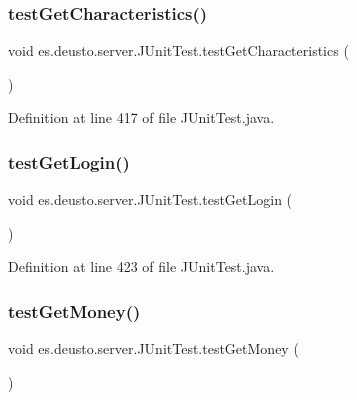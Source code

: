 \subsubsection{\texorpdfstring{test\+Get\+Characteristics()}{testGetCharacteristics()}}
{\footnotesize\ttfamily void es.\+deusto.\+server.\+J\+Unit\+Test.\+test\+Get\+Characteristics (\begin{DoxyParamCaption}{ }\end{DoxyParamCaption})}



Definition at line 417 of file J\+Unit\+Test.\+java.

\mbox{\label{classes_1_1deusto_1_1server_1_1_j_unit_test_a6c7354d3207f6f6e8778d1b85fd31746}} 
\subsubsection{\texorpdfstring{test\+Get\+Login()}{testGetLogin()}}
{\footnotesize\ttfamily void es.\+deusto.\+server.\+J\+Unit\+Test.\+test\+Get\+Login (\begin{DoxyParamCaption}{ }\end{DoxyParamCaption})}



Definition at line 423 of file J\+Unit\+Test.\+java.

\mbox{\label{classes_1_1deusto_1_1server_1_1_j_unit_test_a6204483b84dccff7e6dd2e98d9b20b1b}} 
\subsubsection{\texorpdfstring{test\+Get\+Money()}{testGetMoney()}}
{\footnotesize\ttfamily void es.\+deusto.\+server.\+J\+Unit\+Test.\+test\+Get\+Money (\begin{DoxyParamCaption}{ }\end{DoxyParamCaption})}



